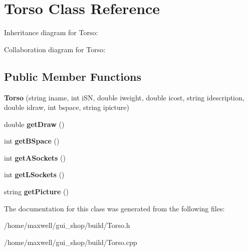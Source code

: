 \hypertarget{classTorso}{}\section{Torso Class Reference}
\label{classTorso}


Inheritance diagram for Torso\+:


Collaboration diagram for Torso\+:
\subsection*{Public Member Functions}
\begin{DoxyCompactItemize}
\item 
{\bfseries Torso} (string iname, int i\+SN, double iweight, double icost, string idescription, double idraw, int bspace, string ipicture)\hypertarget{classTorso_a63e5e65d1ee971aee3596d1c641f144d}{}\label{classTorso_a63e5e65d1ee971aee3596d1c641f144d}

\item 
double {\bfseries get\+Draw} ()\hypertarget{classTorso_a2e08e5c7930d5e80c20b021321fbaacf}{}\label{classTorso_a2e08e5c7930d5e80c20b021321fbaacf}

\item 
int {\bfseries get\+B\+Space} ()\hypertarget{classTorso_a7dbbd58793a196fdc121bf9ef6a3b381}{}\label{classTorso_a7dbbd58793a196fdc121bf9ef6a3b381}

\item 
int {\bfseries get\+A\+Sockets} ()\hypertarget{classTorso_a2c77fe3f461c27400740c9bce4121fcf}{}\label{classTorso_a2c77fe3f461c27400740c9bce4121fcf}

\item 
int {\bfseries get\+L\+Sockets} ()\hypertarget{classTorso_ada7f9c1bf6015925616462f35e6ec28c}{}\label{classTorso_ada7f9c1bf6015925616462f35e6ec28c}

\item 
string {\bfseries get\+Picture} ()\hypertarget{classTorso_ac3e07e761662390a2cd3917a48c946ca}{}\label{classTorso_ac3e07e761662390a2cd3917a48c946ca}

\end{DoxyCompactItemize}


The documentation for this class was generated from the following files\+:\begin{DoxyCompactItemize}
\item 
/home/maxwell/gui\+\_\+shop/build/Torso.\+h\item 
/home/maxwell/gui\+\_\+shop/build/Torso.\+cpp\end{DoxyCompactItemize}
